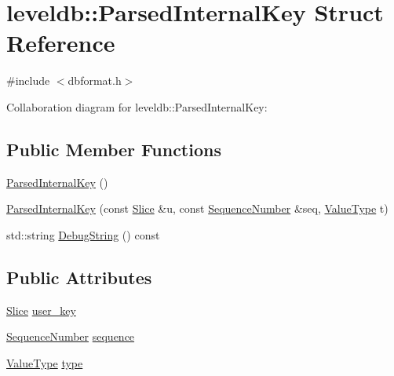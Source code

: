 \hypertarget{structleveldb_1_1_parsed_internal_key}{\section{leveldb\-:\-:Parsed\-Internal\-Key Struct Reference}
\label{structleveldb_1_1_parsed_internal_key}
}


{\ttfamily \#include $<$dbformat.\-h$>$}



Collaboration diagram for leveldb\-:\-:Parsed\-Internal\-Key\-:
\subsection*{Public Member Functions}
\begin{DoxyCompactItemize}
\item 
\hyperlink{structleveldb_1_1_parsed_internal_key_a23885ae8c8ccb36e01cdb3469ea21d67}{Parsed\-Internal\-Key} ()
\item 
\hyperlink{structleveldb_1_1_parsed_internal_key_acc24f6ddeb4223d0484613076a48a9a1}{Parsed\-Internal\-Key} (const \hyperlink{classleveldb_1_1_slice}{Slice} \&u, const \hyperlink{namespaceleveldb_a5481ededd221c36d652c371249f869fa}{Sequence\-Number} \&seq, \hyperlink{namespaceleveldb_acc038cb0d608414730cafa459a4ba866}{Value\-Type} t)
\item 
std\-::string \hyperlink{structleveldb_1_1_parsed_internal_key_abda4655ea6857f75dcb8f409873207d5}{Debug\-String} () const 
\end{DoxyCompactItemize}
\subsection*{Public Attributes}
\begin{DoxyCompactItemize}
\item 
\hyperlink{classleveldb_1_1_slice}{Slice} \hyperlink{structleveldb_1_1_parsed_internal_key_aa6e30fcf3c95fc1485d60fa08efe2b9d}{user\-\_\-key}
\item 
\hyperlink{namespaceleveldb_a5481ededd221c36d652c371249f869fa}{Sequence\-Number} \hyperlink{structleveldb_1_1_parsed_internal_key_a3ab7f4382bc026081875fde4dea95e61}{sequence}
\item 
\hyperlink{namespaceleveldb_acc038cb0d608414730cafa459a4ba866}{Value\-Type} \hyperlink{structleveldb_1_1_parsed_internal_key_ac7c10a6f60f93982b886ad1fbbafd6c2}{type}
\end{DoxyCompactItemize}


